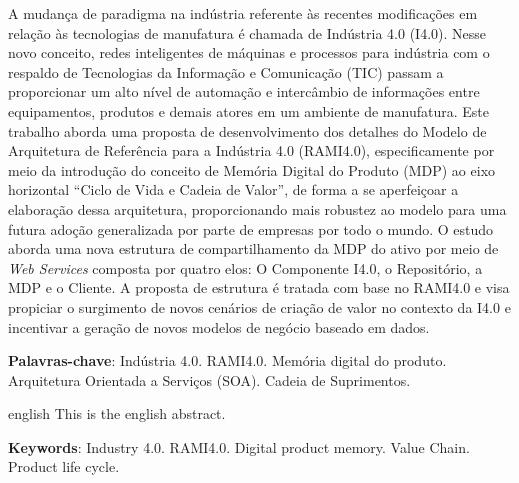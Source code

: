 \setlength{\absparsep}{18pt} %
\begin{resumo}
	A mudança de paradigma na indústria referente às recentes modificações em relação às tecnologias de manufatura é chamada de Indústria 4.0 (I4.0). Nesse novo conceito, redes inteligentes de máquinas e processos para indústria com o respaldo de Tecnologias da Informação e Comunicação (TIC) passam a proporcionar um alto nível de automação e intercâmbio de informações entre equipamentos, produtos e demais atores em um ambiente de manufatura.
	Este trabalho aborda uma proposta de desenvolvimento dos detalhes do Modelo de Arquitetura de Referência para a Indústria 4.0 (RAMI4.0), especificamente por meio da introdução do conceito de Memória Digital do Produto (MDP) ao eixo horizontal ``Ciclo de Vida e Cadeia de Valor'', de forma a se aperfeiçoar a elaboração dessa arquitetura, proporcionando mais robustez ao modelo para uma futura adoção generalizada por parte de empresas por todo o mundo.
	O estudo aborda uma nova estrutura de compartilhamento da MDP do ativo por meio de \textit{Web Services} composta por quatro elos: O Componente I4.0, o Repositório, a MDP e o Cliente. A proposta de estrutura é tratada com base no RAMI4.0 e visa propiciar o surgimento de novos cenários de criação de valor no contexto da I4.0 e incentivar a geração de novos modelos de negócio baseado em dados.
	
	\textbf{Palavras-chave}: Indústria 4.0. RAMI4.0. Memória digital do produto. Arquitetura Orientada a Serviços (SOA). Cadeia de Suprimentos.
\end{resumo}

\begin{resumo}[Abstract]
	\begin{otherlanguage*}{english}
		This is the english abstract.
		
		\vspace{\onelineskip}
		
		\noindent 
		\textbf{Keywords}: Industry 4.0. RAMI4.0. Digital product memory. Value Chain. Product life cycle. 
	\end{otherlanguage*}
\end{resumo}

\listoffigures*
\cleardoublepage

\listoftables*
\cleardoublepage


